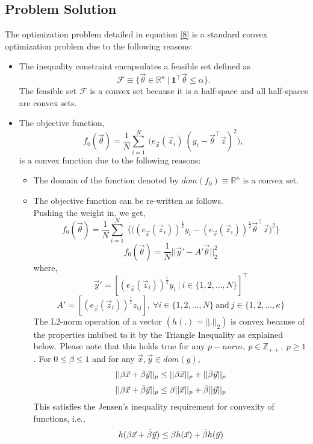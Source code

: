 \documentclass{article}
\begin{document}
\subsection{Problem Solution}
The optimization problem detailed in equation \eqref{8} is a standard convex optimization problem due to the following reasons:
\begin{itemize}
    \item The inequality constraint encapsulates a feasible set defined as \[\mathcal{F} \equiv \{\vec{\theta} \in \mathbb{R}^{\kappa}\ |\ \textbf{1}^\intercal \vec{\theta} \leq \alpha\}.\] The feasible set $\mathcal{F}$ is a convex set because it is a half-space and all half-spaces are convex sets.
    \item The objective function,
    \[f_0(\vec{\theta}) = \frac{1}{N} \sum_{i=1}^N\ \Big(e_{\vec{x}}(\vec{z}_i)\ (y_i - \vec{\theta}^\intercal \vec{z})^2\Big),\] is a convex function due to the following reasons:
    \begin{itemize}
        \item The domain of the function denoted by $dom(f_0) \equiv \mathbb{R}^{\kappa}$ is a convex set.
        \item The objective function can be re-written as follows.
        \\Pushing the weight in, we get,
        \[f_0(\vec{\theta}) = \frac{1}{N} \sum_{i=1}^N\ \Big\{\Big((e_{\vec{x}}(\vec{z}_i))^{\frac{1}{2}} y_{i} - (e_{\vec{x}}(\vec{z}_i))^{\frac{1}{2}} \vec{\theta}^\intercal \vec{z}\Big)^2\Big\}\]
        \[f_0(\vec{\theta}) = \frac{1}{N} ||\vec{y}' - A'\vec{\theta}||_2^{2}\]
        where,
        \[\vec{y}' = [(e_{\vec{x}}(\vec{z}_i))^{\frac{1}{2}} y_i\ |\ i \in \{1, 2, \dots, N\}]^\intercal\]
        \[A' = [(e_{\vec{x}}(\vec{z}_i))^{\frac{1}{2}} z_{ij}],\ \forall i \in \{1, 2, \dots, N\}\ \text{and}\ j \in \{1, 2, \dots, \kappa\}\]
        The L2-norm operation of a vector $(h(.) = ||.||_2)$ is convex because of the properties imbibed to it by the Triangle Inequality as explained below. Please note that this holds true for any $p-norm,\ p \in \mathbb{Z}_{++},\ p \geq 1$.
        For $0 \leq \beta \leq 1$ and for any $\vec{x}, \vec{y} \in dom(g)$,
        \[||\beta \vec{x} + \Bar{\beta} \vec{y}||_p \leq ||\beta \vec{x}||_p + ||\Bar{\beta} \vec{y}||_p\]
        \[||\beta \vec{x} + \Bar{\beta} \vec{y}||_p \leq \beta||\vec{x}||_p + \Bar{\beta}||\vec{y}||_p\]
        This satisfies the Jensen's inequality requirement for convexity of functions, i.e.,
        \[h(\beta \vec{x} + \Bar{\beta} \vec{y}) \leq \beta h(\vec{x}) + \Bar{\beta} h(\vec{y})\]

\end{itemize}
\end{itemize}
\end{document}
